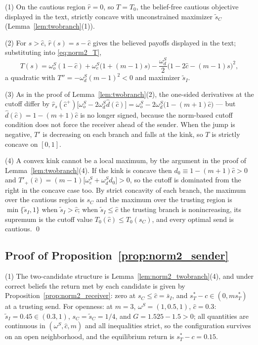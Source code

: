 \documentclass[11pt]{article}
\theoremstyle{plain}
\theoremstyle{remark}
\begin{document}
(1) On the cautious region $\hat r=0$, so $T=T_0$, the belief-free cautious objective displayed in the text, strictly concave with unconstrained maximizer $\tilde s_C$ (Lemma~\ref{lem:twobranch}(1)).

(2) For $s>\hat c$, $\hat r(s)=s-\hat c$ gives the believed payoffs displayed in the text; substituting into \eqref{eq:norm2_T},
\[
        T(s)=\omega_o^S(1-\hat c)+\omega_e^S\big(1+(m-1)s\big)-\frac{\omega_d^S}{2}\big(1-2\hat c-(m-1)s\big)^2,
\]
a quadratic with $T''=-\omega_d^S(m-1)^2<0$ and maximizer $\tilde s_I$.

(3) As in the proof of Lemma~\ref{lem:twobranch}(2), the one-sided derivatives at the cutoff differ by $\hat r_s(\hat c^+)\big[\omega_o^S-2\omega_d^S\hat d(\hat c)\big]=\omega_o^S-2\omega_d^S\big(1-(m+1)\hat c\big)$ --- but $\hat d(\hat c)=1-(m+1)\hat c$ is no longer signed, because the norm-based cutoff condition does not force the receiver ahead of the sender.  When the jump is negative, $T'$ is decreasing on each branch and falls at the kink, so $T$ is strictly concave on $[0,1]$.

(4) A convex kink cannot be a local maximum, by the argument in the proof of Lemma~\ref{lem:twobranch}(4).  If the kink is concave then $d_0\equiv1-(m+1)\hat c>0$ and $T'_+(\hat c)=(m-1)\big[\omega_e^S+\omega_d^S d_0\big]>0$, so the cutoff is dominated from the right in the concave case too.  By strict concavity of each branch, the maximum over the cautious region is $s_C$ and the maximum over the trusting region is $\min\{\tilde s_I,1\}$ when $\tilde s_I>\hat c$; when $\tilde s_I\le\hat c$ the trusting branch is nonincreasing, its supremum is the cutoff value $T_0(\hat c)\le T_0(s_C)$, and every optimal send is cautious.
\qed

\subsection*{Proof of Proposition~\ref{prop:norm2_sender}}

(1) The two-candidate structure is Lemma~\ref{lem:norm2_twobranch}(4), and under correct beliefs the return met by each candidate is given by Proposition~\ref{prop:norm2_receiver}: zero at $s_C\le\hat c=\bar s_I$, and $s_T^\ast-c\in(0,ms_T^\ast)$ at a trusting send.  For openness: at $m=3$, $\omega^S=(1,0.5,1)$, $\hat c=0.3$: $\tilde s_I=0.45\in(0.3,1)$, $s_C=\tilde s_C=1/4$, and $G=1.525-1.5>0$; all quantities are continuous in $(\omega^S,\hat c,m)$ and all inequalities strict, so the configuration survives on an open neighborhood, and the equilibrium return is $s_T^\ast-c=0.15$.
\end{document}
